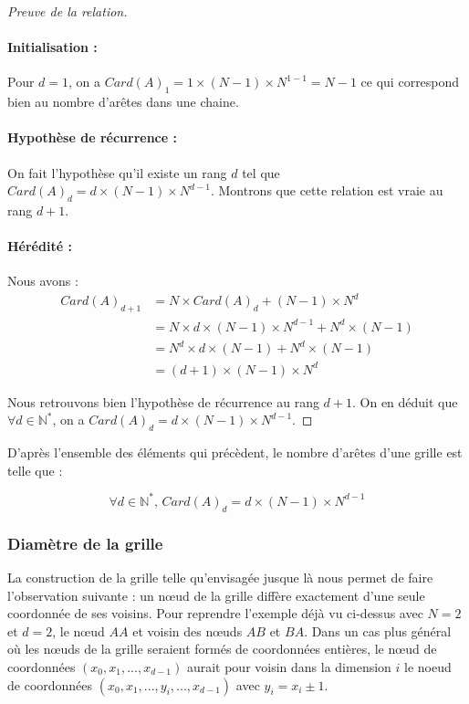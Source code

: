\begin{proof}[Preuve de la relation]
\item
\paragraph{Initialisation :} 
Pour $d=1$, on a $Card(A)_1 = 1\times (N-1)\times N^{1-1} = N-1$ ce qui correspond bien au nombre d'arêtes dans une chaine.

\paragraph{Hypothèse de récurrence :}
On fait l'hypothèse qu'il existe un rang $d$ tel que $Card(A)_d = d\times (N-1)\times N^{d-1}$. Montrons que cette relation est vraie au rang $d+1$.

\paragraph{Hérédité :} Nous avons :
\begin{align*}
Card(A)_{d+1} & = N \times Card(A)_d + (N-1)\times N^d \\
& = N\times d\times (N-1)\times N^{d-1} + N^d\times (N-1)\\
& = N^d\times d\times (N-1) + N^d\times (N-1)\\
& = (d+1)\times (N-1)\times N^d
\end{align*}

Nous retrouvons bien l'hypothèse de récurrence au rang $d+1$. On en déduit que $\forall d \in \mathbb{N^*}$, on a $Card(A)_d = d\times (N-1)\times N^{d-1}$.
\end{proof}

D'après l'ensemble des éléments qui précèdent, le nombre d'arêtes d'une grille est telle que :

$$\forall d \in \mathbb{N^*} \text{, }Card(A)_d = d\times (N-1)\times N^{d-1} $$ 


\subsubsection{Diamètre de la grille}

La construction de la grille telle qu'envisagée jusque là nous permet de faire l'observation suivante : un nœud de la grille diffère exactement d'une seule coordonnée de ses voisins. Pour reprendre l'exemple déjà vu ci-dessus avec $N=2$ et $d=2$, le nœud $AA$ et voisin des nœuds $AB$ et $BA$. Dans un cas plus général où les nœuds de la grille seraient formés de coordonnées entières, le nœud de coordonnées $(x_0,x_1, ..., x_{d-1})$ aurait pour voisin dans la dimension $i$ le noeud de coordonnées $(x_0,x_1,...,y_i,...,x_{d-1})$ avec $y_i=x_i\pm1$.


